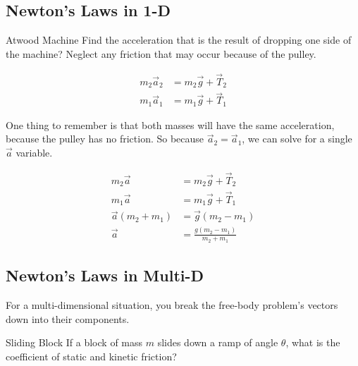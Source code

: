 \subsection{Newton's Laws in 1-D} \label{subsec:Newtons Laws 1-D}
\begin{example}[]{Atwood Machine}
  Find the acceleration that is the result of dropping one side of the machine?
  Neglect any friction that may occur because of the pulley.

  \tcblower

  \begin{align*}
    m_{2} \vec{a}_{2} &= m_{2} \vec{g} + \vec{T}_{2} \\
    m_{1} \vec{a}_{1} &= m_{1} \vec{g} + \vec{T}_{1}
  \end{align*}

  One thing to remember is that both masses will have the same acceleration, because the pulley has no friction.
  So because $\vec{a}_{2} = \vec{a}_{1}$, we can solve for a single $\vec{a}$ variable.

  \begin{align*}
    m_{2} \vec{a} &= m_{2} \vec{g} + \vec{T}_{2} \\
    m_{1} \vec{a} &= m_{1} \vec{g} + \vec{T}_{1} \\
    \vec{a} \left( m_{2} + m_{1} \right) &= \vec{g} \left( m_{2} - m_{1} \right) \\
    \vec{a} &= \frac{g \left( m_{2} - m_{1} \right)}{m_{2}+m_{1}}
  \end{align*}
\end{example}

\subsection{Newton's Laws in Multi-D} \label{subsec:Newtons Laws Multi-D}
For a multi-dimensional situation, you break the free-body problem's vectors down into their components.

\begin{example}[]{Sliding Block}
  If a block of mass $m$ slides down a ramp of angle $\theta$, what is the coefficient of static and kinetic friction?

  \tcblower

\end{example}
